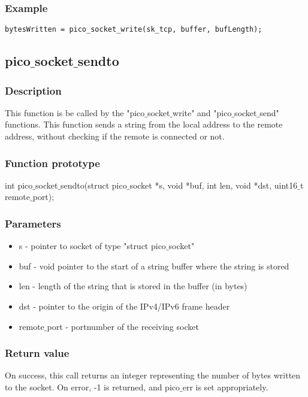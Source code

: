 \subsubsection*{Example}
\begin{verbatim}
bytesWritten = pico_socket_write(sk_tcp, buffer, bufLength);
\end{verbatim}


\subsection{pico$\_$socket$\_$sendto}

\subsubsection*{Description}
This function is be called by the "pico$\_$socket$\_$write" and "pico$\_$socket$\_$send" functions.
This function sends a string from the local address to the remote address, without checking
if the remote is connected or not.

\subsubsection*{Function prototype}
int pico$\_$socket$\_$sendto(struct pico$\_$socket *s, void *buf, int len, void *dst, uint16$\_$t remote$\_$port);

\subsubsection*{Parameters}
\begin{itemize}
\item s - pointer to socket of type "struct pico$\_$socket"
\item buf - void pointer to the start of a string buffer where the string is stored
\item len - length of the string that is stored in the buffer (in bytes)
\item dst - pointer to the origin of the IPv4/IPv6 frame header
\item remote$\_$port - portnumber of the receiving socket
\end{itemize}

\subsubsection*{Return value}
On success, this call returns an integer representing the number of bytes written to the socket.
On error, -1 is returned, and pico$\_$err is set appropriately.

